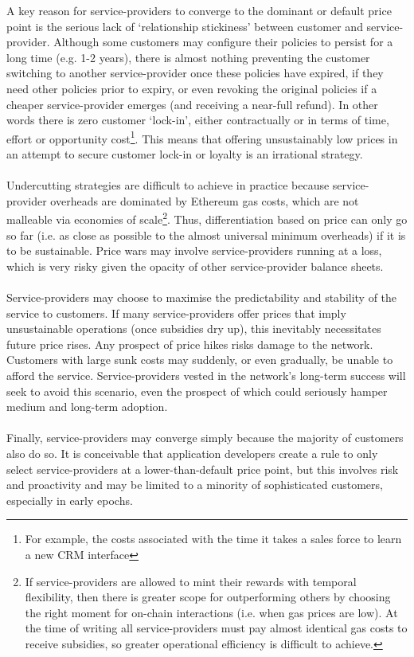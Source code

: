 \documentclass[longbibliography,nofootinbib]{revtex4-1}
\begin{document}
A key reason for service-providers to converge to the dominant or default price point is the serious lack of `relationship stickiness’ between customer and service-provider. Although some customers may configure their policies to persist for a long time (e.g. 1-2 years),  there is almost nothing preventing the customer switching to another service-provider once these policies have expired, if they need other policies prior to expiry, or even revoking the original policies if a cheaper service-provider emerges (and receiving a near-full refund). In other words there is zero customer `lock-in’, either contractually or in terms of time, effort or opportunity cost\footnote{For example, the costs associated with the time it takes a sales force to learn a new CRM interface}. This means that offering unsustainably low prices in an attempt to secure customer lock-in or loyalty is an irrational strategy.
\\\\
Undercutting strategies are difficult to achieve in practice because service-provider overheads are dominated by Ethereum gas costs, which are not malleable via economies of scale\footnote{If service-providers are allowed to mint their rewards with temporal flexibility, then there is greater scope for outperforming others by choosing the right moment for on-chain interactions (i.e. when gas prices are low). At the time of writing all service-providers must pay almost identical gas costs to receive subsidies, so greater operational efficiency is difficult to achieve.}. Thus, differentiation based on price can only go so far (i.e. as close as possible to the almost universal minimum overheads) if it is to be sustainable. Price wars may involve service-providers running at a loss, which is very risky given the opacity of other service-provider balance sheets. 
\\\\
Service-providers may choose to maximise the predictability and stability of the service to customers. If many service-providers offer prices that imply unsustainable operations (once subsidies dry up), this inevitably necessitates future price rises. Any prospect of price hikes risks damage to the network. Customers with large sunk costs may suddenly, or even gradually, be unable to afford the service. Service-providers vested in the network's long-term success will seek to avoid this scenario, even the prospect of which could seriously hamper medium and long-term adoption.
\\\\
Finally, service-providers may converge simply because the majority of customers also do so. It is conceivable that application developers create a rule to only select service-providers at a lower-than-default price point, but this involves risk and proactivity and may be limited to a minority of sophisticated customers, especially in early epochs.



\end{document}
